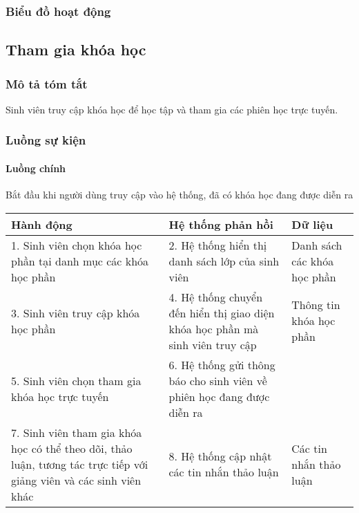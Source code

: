 \documentclass[./../main_file.tex]{subfiles}
\begin{document}
\subsubsection{Biểu đồ hoạt động}

\subsection{Tham gia khóa học}
\subsubsection{Mô tả tóm tắt}
Sinh viên truy cập khóa học để học tập và tham gia các phiên học trực tuyến.

\subsubsection{Luồng sự kiện}
\paragraph{Luồng chính}
Bắt đầu khi người dùng truy cập vào hệ thống, đã có khóa học đang được diễn ra
\begin{longtable}{|p{}|p{}|p{}|}
		\hline
		\textbf{Hành động}                                           & \textbf{Hệ thống phản hồi}                                                   & \textbf{Dữ liệu}           \\ \hline
		1. Sinh viên chọn khóa học phần tại danh mục các khóa học phần & 2. Hệ thống hiển thị danh sách lớp của sinh viên                             & Danh sách các khóa học phần \\ \hline
		3. Sinh viên truy cập khóa học phần                           & 4. Hệ thống chuyển đến hiển thị giao diện khóa học phần mà sinh viên truy cập & Thông tin khóa học phần     \\ \hline
		5. Sinh viên chọn tham gia khóa học trực tuyến                & 6. Hệ thống gửi thông báo cho sinh viên về phiên học đang được diễn ra       &                            \\ \hline
		7. Sinh viên tham gia khóa học có thể theo dõi, thảo luận, tương tác trực tiếp với giảng viên và các sinh viên khác &
		8. Hệ thống cập nhật các tin nhắn thảo luận &
		Các tin nhắn thảo luận \\ \hline
\end{longtable}
\end{document}
